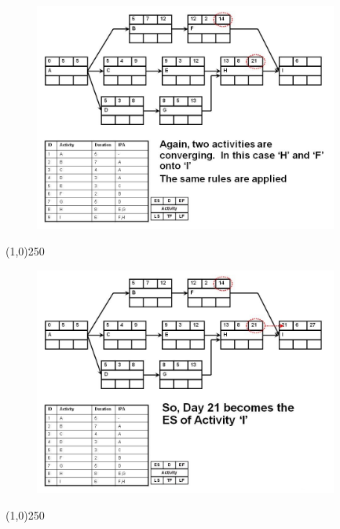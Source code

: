 \begin{frame}
\begin{figure}
	\centering
		\includegraphics[width = 10.0cm]{oldnotes/Slide148.jpg}
\end{figure}
\end{frame}
\begin{center}\line(1,0){250}\end{center}




\begin{frame}
\begin{figure}
	\centering
		\includegraphics[width = 10.0cm]{oldnotes/Slide149.jpg}
\end{figure}
\end{frame}
\begin{center}\line(1,0){250}\end{center}





